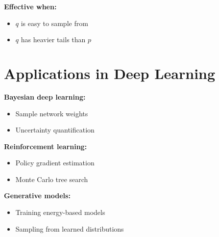 \textbf{Effective when:}
\begin{itemize}
    \item $q$ is easy to sample from
    \item $q$ has heavier tails than $p$
\end{itemize}

\section{Applications in Deep Learning}
\label{sec:mc-applications}

\textbf{Bayesian deep learning:}
\begin{itemize}
    \item Sample network weights
    \item Uncertainty quantification
\end{itemize}

\textbf{Reinforcement learning:}
\begin{itemize}
    \item Policy gradient estimation
    \item Monte Carlo tree search
\end{itemize}

\textbf{Generative models:}
\begin{itemize}
    \item Training energy-based models
    \item Sampling from learned distributions
\end{itemize}
